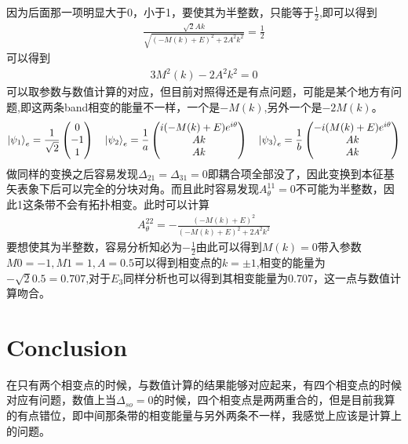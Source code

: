\documentclass[22pt]{article}
\begin{document}
因为后面那一项明显大于0，小于1，要使其为半整数，只能等于$\frac{1}{2}$,即可以得到
\begin{align}
	\frac{\sqrt{2}Ak}{\sqrt{(-M(k)+E)^2+2A^2k^2}}=\frac{1}{2}
\end{align}
可以得到
\begin{align}
	3M^2(k)-2A^2k^2=0
\end{align}
可以取参数与数值计算的对应，但目前对照得还是有点问题，可能是某个地方有问题,即这两条band相变的能量不一样，一个是$-M(k)$,另外一个是$-2M(k)$。
\begin{align}
	\ket{\psi_{1}}_e=\frac{1}{\sqrt{2}}
	\begin{pmatrix}
		0\\
		-1\\
		1
	\end{pmatrix}
	\quad
	\ket{\psi_{2}}_e=\frac{1}{a}
	\begin{pmatrix}
		i(-M(k)+E)e^{i\theta}\\
		Ak\\
		Ak
	\end{pmatrix}
	\quad
	\ket{\psi_{3}}_e=
	\frac{1}{b}
	\begin{pmatrix}
		-i(M(k)+E)e^{i\theta}\\
		Ak\\
		Ak
	\end{pmatrix}
\end{align}
做同样的变换之后容易发现$\Delta_{21}=\Delta_{31}=0$即耦合项全部没了，因此变换到本征基矢表象下后可以完全的分块对角。而且此时容易发现$A_{\theta}^{11}=0$不可能为半整数，因此1这条带不会有拓扑相变。此时可以计算
\begin{align}
	A_{\theta}^{22}=-\frac{(-M(k)+E)^2}{(-M(k)+E)^2+2A^2k^2}
\end{align}
要想使其为半整数，容易分析知必为$-\frac{1}{2}$由此可以得到$M(k)=0$带入参数$M0=-1,M1=1,A=0.5$可以得到相变点的$k=\pm 1$,相变的能量为$-\sqrt{2}0.5= 0.707$,对于$E_3$同样分析也可以得到其相变能量为0.707，这一点与数值计算吻合。

\section{Conclusion}
在只有两个相变点的时候，与数值计算的结果能够对应起来，有四个相变点的时候对应有问题，数值上当$\Delta_{so}=0$的时候，四个相变点是两两重合的，但是目前我算的有点错位，即中间那条带的相变能量与另外两条不一样，我感觉上应该是计算上的问题。
\end{document}
